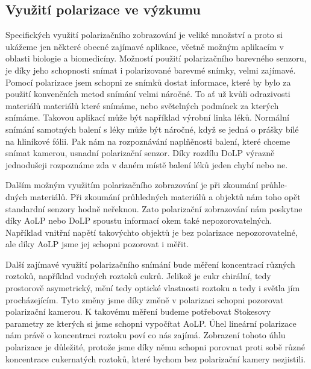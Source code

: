\documentclass[a4paper]{article}
\numberwithin{equation}{section}
\begin{document}
    \subsection{Využití polarizace ve výzkumu}
    Specifických využití polarizačního zobrazování je veliké množství a proto si ukážeme jen některé obecné zajímavé aplikace, včetně možným aplikacím v oblasti biologie a biomedicíny. Možností použití polarizačního barevného senzoru, je díky jeho schopnosti snímat i polarizované barevmé snímky, velmi zajímavé. Pomocí polarizace jsem schopni ze snímků dostat informace, které by bylo za použití konvenčních metod snímání velmi náročné. To ať už kvůli odrazivosti materiálů materiálů které snímáme, nebo světelných podmínek za kterých snímáme. Takovou aplikací může být například výrobní linka léků. Normální snímání samotných balení s léky může být náročné, když se jedná o prášky bílé na hliníkové fólii. Pak nám na rozpoznávání naplňěnosti balení, které chceme snímat kamerou, usnadní polarizační senzor. Díky rozdílu DoLP výrazně jednodušeji rozpoznáme zda v daném místě balení léků jeden chybí nebo ne. \cite{pharmaceutics}
    \par Dalším možným využitím polarizačního zobrazování je při zkoumání průhle-
    \\dných materiálů. Při zkoumání průhledných materiálů a objektů nám toho opět standardní senzory hodně neřeknou. Zato polarizační zobrazování nám poskytne díky AoLP nebo DoLP spoustu informací okem také nepozorovatelných. Například vnitřní napětí takovýchto objektů je bez polarizace nepozorovatelné, ale díky AoLP jsme jej schopni pozorovat i měřit. \cite{stresy}
    \par Další zajímavé využití polarizačního snímání bude měření koncentrací různých roztoků, například vodných roztoků cukrů. Jelikož je cukr chirální, tedy prostorově asymetrický, mění tedy optické vlastnosti roztoku a tedy i světla jím procházejícím. \cite{chiralita} Tyto změny jsme díky změně v polarizaci schopni pozorovat polarizační kamerou. K takovému měření budeme potřebovat Stokesovy parametry ze kterých si jsme schopni vypočítat AoLP. Úhel lineární polarizace nám právě o koncentraci roztoku poví co nás zajímá. Zobrazení tohoto úhlu polarizace je důležité, protože jsme díky němu schopni porovnat proti sobě různé koncentrace cukernatých roztoků, které bychom bez polarizační kamery nezjistili. \cite{sugar}
\end{document}
